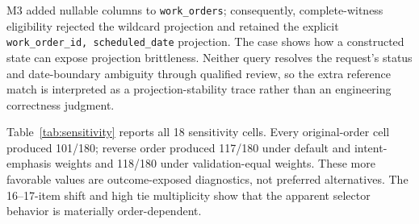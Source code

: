 \documentclass[applsci,article,submit,moreauthors]{Definitions/mdpi}
\begin{document}
\begin{table}[htbp]
\caption{Q039 is the sole validation-only versus complete-witness selection difference. Correctness is agreement with the frozen synthetic reference, not an independently adjudicated engineering judgment.}
\label{tab:q039}
\centering
\footnotesize
{}
\end{table}

M3 added nullable columns to \texttt{work\_orders}; consequently, complete-witness eligibility rejected the wildcard projection and retained the explicit \texttt{work\_order\_id, scheduled\_date} projection. The case shows how a constructed state can expose projection brittleness. Neither query resolves the request's status and date-boundary ambiguity through qualified review, so the extra reference match is interpreted as a projection-stability trace rather than an engineering correctness judgment.

Table~\ref{tab:sensitivity} reports all 18 sensitivity cells. Every original-order cell produced 101/180; reverse order produced 117/180 under default and intent-emphasis weights and 118/180 under validation-equal weights. These more favorable values are outcome-exposed diagnostics, not preferred alternatives. The 16--17-item shift and high tie multiplicity show that the apparent selector behavior is materially order-dependent.
\end{document}
